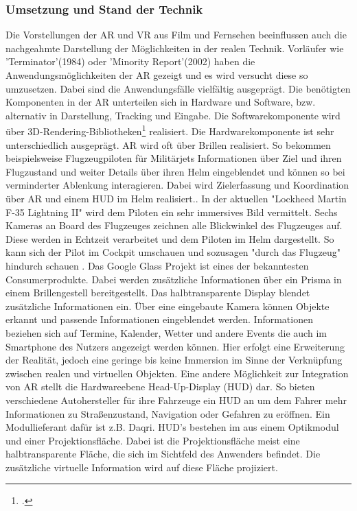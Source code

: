 \documentclass[12pt,a4paper,bibliography=totocnumbered,listof=totocnumbered]{scrartcl}
\begin{document}
\subsubsection{Umsetzung und Stand der Technik}
Die Vorstellungen der AR und VR aus Film und Fernsehen beeinflussen auch die nachgeahmte Darstellung der Möglichkeiten in der realen Technik. Vorläufer wie 'Terminator'(1984) oder 'Minority Report'(2002) haben die Anwendungsmöglichkeiten der AR gezeigt und es wird versucht diese so umzusetzen. Dabei sind die Anwendungsfälle vielfältig ausgeprägt.\newline
Die benötigten Komponenten in der AR unterteilen sich in Hardware und Software, bzw. alternativ in Darstellung, Tracking und Eingabe. Die Softwarekomponente wird über 3D-Rendering-Bibliotheken\footcites{bspw. OpenGL und DirectX} realisiert. Die Hardwarekomponente ist sehr unterschiedlich ausgeprägt.
AR wird oft über Brillen realisiert. So bekommen beispielsweise Flugzeugpiloten für Militärjets Informationen über Ziel und ihren Flugzustand und weiter Details über ihren Helm eingeblendet und können so bei verminderter Ablenkung interagieren. Dabei wird Zielerfassung und Koordination über AR und einem HUD im Helm realisiert.\cite{Jenkins:2007aa}. In der aktuellen "Lockheed Martin F-35 Lightning II" wird dem Piloten ein sehr immersives Bild vermittelt. Sechs Kameras an Board des Flugzeuges zeichnen alle Blickwinkel des Flugzeuges auf. Diese werden in Echtzeit verarbeitet und dem Piloten im Helm dargestellt. So kann sich der Pilot im Cockpit umschauen und sozusagen "durch das Flugzeug" hindurch schauen \cite{MOYNIHAN:aa}.
Das Google Glass Projekt ist eines der bekanntesten Consumerprodukte. Dabei werden zusätzliche Informationen über ein Prisma in einem Brillengestell bereitgestellt. Das halbtransparente Display blendet zusätzliche Informationen ein. Über eine eingebaute Kamera können Objekte erkannt und passende Informationen eingeblendet werden. Informationen beziehen sich auf Termine, Kalender, Wetter und andere Events die auch im Smartphone des Nutzers angezeigt werden können. Hier erfolgt eine Erweiterung der Realität, jedoch eine geringe bis keine Immersion im Sinne der Verknüpfung zwischen realen und virtuellen Objekten. 
Eine andere Möglichkeit zur Integration von AR stellt die Hardwareebene Head-Up-Display (\ac{HUD}) dar. So bieten verschiedene Autohersteller für ihre Fahrzeuge ein HUD an um dem Fahrer mehr Informationen zu Straßenzustand, Navigation oder Gefahren zu eröffnen. Ein Modullieferant dafür ist z.B. Daqri. HUD's bestehen im aus einem Optikmodul und einer Projektionsfläche. Dabei ist die Projektionsfläche meist eine halbtransparente Fläche, die sich im Sichtfeld des Anwenders befindet. Die zusätzliche virtuelle Information wird auf diese Fläche projiziert. 
\end{document}
